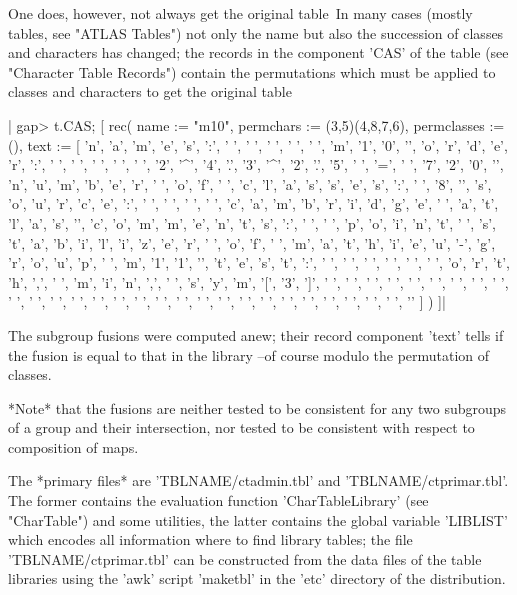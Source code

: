 One does,  however, not always get the  original {\CAS}  table\:\ In many
cases (mostly {\ATLAS} tables, see "ATLAS Tables")  not only the name but
also the succession of classes and characters has changed; the records in
the component 'CAS' of the  table (see "Character Table Records") contain
the permutations which must  be applied to classes  and characters to get
the original {\CAS} table\:

|    gap> t.CAS;
    [ rec(
          name := "m10",
          permchars := (3,5)(4,8,7,6),
          permclasses := (),
          text := [ 'n', 'a', 'm', 'e', 's', ':', ' ', ' ', ' ', ' ',
              ' ', 'm', '1', '0', '\n', 'o', 'r', 'd', 'e', 'r', ':',
              ' ', ' ', ' ', ' ', ' ', '2', '^', '4', '.', '3', '^', '2',
              '.', '5', ' ', '=', ' ', '7', '2', '0', '\n', 'n', 'u',
              'm', 'b', 'e', 'r', ' ', 'o', 'f', ' ', 'c', 'l', 'a', 's',
              's', 'e', 's', ':', ' ', '8', '\n', 's', 'o', 'u', 'r',
              'c', 'e', ':', ' ', ' ', ' ', ' ', 'c', 'a', 'm', 'b', 'r',
              'i', 'd', 'g', 'e', ' ', 'a', 't', 'l', 'a', 's', '\n',
              'c', 'o', 'm', 'm', 'e', 'n', 't', 's', ':', ' ', ' ', 'p',
              'o', 'i', 'n', 't', ' ', 's', 't', 'a', 'b', 'i', 'l', 'i',
              'z', 'e', 'r', ' ', 'o', 'f', ' ', 'm', 'a', 't', 'h', 'i',
              'e', 'u', '-', 'g', 'r', 'o', 'u', 'p', ' ', 'm', '1', '1',
              '\n', 't', 'e', 's', 't', ':', ' ', ' ', ' ', ' ', ' ',
              ' ', 'o', 'r', 't', 'h', ',', ' ', 'm', 'i', 'n', ',', ' ',
              's', 'y', 'm', '[', '3', ']', ' ', ' ', ' ', ' ', ' ', ' ',
              ' ', ' ', ' ', ' ', ' ', ' ', ' ', ' ', ' ', ' ', ' ', ' ',
              ' ', ' ', ' ', ' ', ' ', ' ', ' ', ' ', ' ', ' ', '\n' ] ) ]|

The subgroup  fusions were computed anew;  their record  component 'text'
tells if the  fusion is equal to that  in the {\CAS} library --of  course
modulo the permutation of classes.

*Note* that the fusions are  neither tested to  be consistent for any two
subgroups of a group and their  intersection, nor tested to be consistent
with respect to composition of maps.


The *primary files* are 'TBLNAME/ctadmin.tbl' and 'TBLNAME/ctprimar.tbl'.
The former contains the evaluation function 'CharTableLibrary'
(see "CharTable") and some utilities, the latter contains the global
variable 'LIBLIST' which encodes all information where to find library
tables; the file 'TBLNAME/ctprimar.tbl' can be constructed from the data
files of the table libraries using the 'awk' script 'maketbl' in the
'etc' directory of the {\GAP} distribution.

